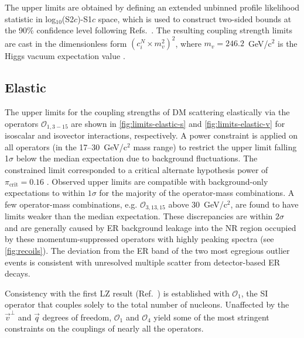 \documentclass[reprint, showpacs,
preprintnumbers,
amsmath,amssymb,
aps, floatfix,
superscriptaddress,
prd, nofootinbib]{revtex4-1}
\begin{document}
The upper limits are obtained by defining an extended unbinned profile likelihood statistic in log$_{10}$(S2$c$)-S1$c$ space, which is used to construct two-sided bounds at the 90\% confidence level following Refs.~\cite{LZ:SR1WS_2022, DM_parameters:BAXTER2021_Conventions}. 
The resulting coupling strength limits are cast in the dimensionless form $(c_i^N \times m_v^2)^2$, where $m_v = 246.2$~GeV/c$^2$ is the Higgs vacuum expectation value \cite{Anand:MathematicaEFT}. 

\subsection{Elastic}\label{subsec:elastic}
\par
The upper limits for the coupling strengths of DM scattering elastically via the operators $\mathcal{O}_{1,3-15}$ are shown in \autoref{fig:limits-elastic-s} and \autoref{fig:limits-elastic-v} for isoscalar and isovector interactions, respectively. 
A power constraint is applied on all operators (in the 17--30~GeV/c$^2$ mass range) to restrict the upper limit falling 1$\sigma$ below the median expectation due to background fluctuations. 
The constrained limit corresponded to a critical alternate hypothesis power of $\pi_\text{crit} = 0.16$ \cite{LZ:SR1WS_2022, DM_parameters:BAXTER2021_Conventions, Cowan:2011_power_constraints}.
Observed upper limits are compatible with background-only expectations to within $1\sigma$ for the majority of the operator-mass combinations.
A few operator-mass combinations, e.g. $\mathcal{O}_{3, 13, 15}$ above 30~GeV/c$^2$, are found to have limits weaker than the median expectation.
These discrepancies are within $2\sigma$ and are generally caused by ER background leakage into the NR region occupied by these momentum-suppressed operators with highly peaking spectra (see \autoref{fig:recoils}).
The deviation from the ER band of the two most egregious outlier events is consistent with unresolved multiple scatter from detector-based ER decays.
\par
Consistency with the first LZ result (Ref.~\cite{LZ:SR1WS_2022}) is established with $\mathcal{O}_1$, the SI operator that couples solely to the total number of nucleons.
Unaffected by the $\vec{v}^\perp$ and $\vec{q}$ degrees of freedom, $\mathcal{O}_1$ and $\mathcal{O}_4$ yield some of the most stringent constraints on the couplings of nearly all the operators.
\end{document}
